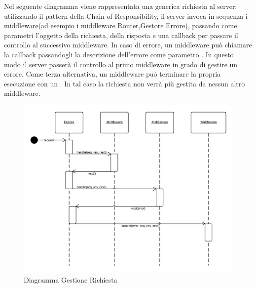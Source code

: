 Nel seguente diagramma viene rappresentata una generica richiesta al server: utilizzando il pattern della Chain of Responsibility, il server invoca in sequenza i middleware(ad esempio i middleware Router,Gestore Errore), passando come parametri l'oggetto della richiesta, della risposta e una callback per passare il controllo al successivo middleware. In caso di errore, un middleware può chiamare la callback passandogli la descrizione dell'errore come parametro . In questo modo il server passerà il controllo al primo middleware in grado di gestire un errore. Come terza alternativa, un middleware può terminare la propria esecuzione con un . In tal caso la richiesta non verrà più gestita da nessun altro middleware.

\begin{figure}[H]
	\begin{center} 
		\includegraphics[scale=0.27]{scenari/Diagramma Gestione Richiesta.png}  
		\caption{Diagramma Gestione Richiesta}
	\end{center}  
\end{figure} 

